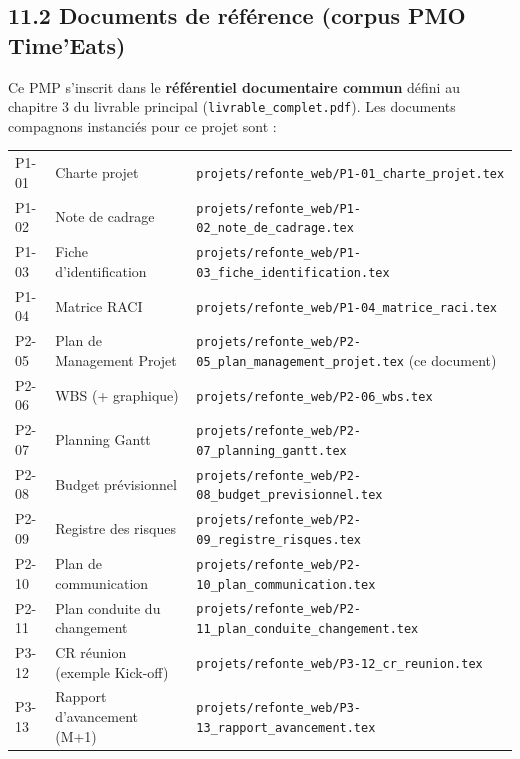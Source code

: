 \documentclass[11pt,a4paper,oneside]{report}
\begin{document}
\subsection*{11.2 Documents de référence (corpus PMO Time'Eats)}
Ce PMP s'inscrit dans le \textbf{référentiel documentaire commun} défini au chapitre 3 du livrable principal (\texttt{livrable\_complet.pdf}). Les documents compagnons instanciés pour ce projet sont :

\renewcommand{\arraystretch}{1.25}
\begin{tabularx}{\textwidth}{C{1.2cm} L{4.5cm} Y}
\toprule
{} &  &  \\
\midrule
P1-01 & Charte projet               & \texttt{projets/refonte\_web/P1-01\_charte\_projet.tex} \\
P1-02 & Note de cadrage             & \texttt{projets/refonte\_web/P1-02\_note\_de\_cadrage.tex} \\
P1-03 & Fiche d'identification      & \texttt{projets/refonte\_web/P1-03\_fiche\_identification.tex} \\
P1-04 & Matrice RACI                & \texttt{projets/refonte\_web/P1-04\_matrice\_raci.tex} \\
P2-05 & Plan de Management Projet   & \texttt{projets/refonte\_web/P2-05\_plan\_management\_projet.tex} (ce document) \\
P2-06 & WBS (+ graphique)           & \texttt{projets/refonte\_web/P2-06\_wbs.tex} \\
P2-07 & Planning Gantt              & \texttt{projets/refonte\_web/P2-07\_planning\_gantt.tex} \\
P2-08 & Budget prévisionnel         & \texttt{projets/refonte\_web/P2-08\_budget\_previsionnel.tex} \\
P2-09 & Registre des risques        & \texttt{projets/refonte\_web/P2-09\_registre\_risques.tex} \\
P2-10 & Plan de communication       & \texttt{projets/refonte\_web/P2-10\_plan\_communication.tex} \\
P2-11 & Plan conduite du changement & \texttt{projets/refonte\_web/P2-11\_plan\_conduite\_changement.tex} \\
P3-12 & CR réunion (exemple Kick-off) & \texttt{projets/refonte\_web/P3-12\_cr\_reunion.tex} \\
P3-13 & Rapport d'avancement (M+1)  & \texttt{projets/refonte\_web/P3-13\_rapport\_avancement.tex} \\
\bottomrule
\end{tabularx}
\end{document}
